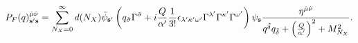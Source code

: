 \begin{equation}
 P_F(q)_{{\bf s}'{\bf s}}^{{\hat \mu}{\hat \nu}} =
  \sum_{N_X=0}^\infty d(N_X)
  {\bar \psi}_{{\bf s}'}
   \left(
    q_{\tilde \sigma} \Gamma^{\tilde \sigma}
    + i {Q \over {\alpha'}} {1 \over {3!}}
        \epsilon_{\lambda'\kappa'\omega'}
         \Gamma^{\lambda'} \Gamma^{\kappa'} \Gamma^{\omega'}
   \right)
  \psi_{\bf s}
  {{\eta^{{\hat \mu}{\hat \nu}}} \over
   {
   q^{\tilde \delta} q_{\tilde \delta}
   + \left( {Q \over {\alpha'}} \right)^2 + M_{N_X}^2
   }}.
\label{propagator3}
\end{equation}


